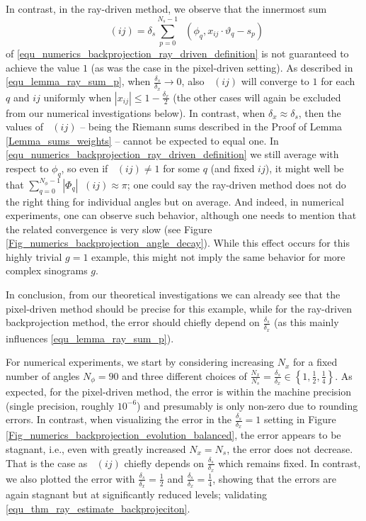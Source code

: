 \documentclass[11pt,reqno]{amsart}
\newcommand{\sums}{\sum_{p=0}^{N_s-1}}
\newcommand{\sumphi}{\sum_{q=0}^{N_\phi-1}}
\DeclareMathOperator{\RayWeight}{\omega^\mathrm{rd}_{\delta_\mathit{x}}}
\DeclareMathOperator{\RayFq}{F^\mathrm{rd}_q}
\numberwithin{theorem}{section}
\theoremstyle{remark}
\begin{document}
In contrast, in the ray-driven method, we observe that the innermost sum 
\[\RayFq (ij) = \delta_s \sums \RayWeight(\phi_q,x_{ij}\cdot \vartheta_q-s_p)\] of \eqref{equ_numerics_backprojection_ray_driven_definition} is not guaranteed to achieve the value $1$ (as was the case in the pixel-driven setting). As described in \eqref{equ_lemma_ray_sum_p}, when $\frac{\delta_s}{\delta_x} \to 0$, also $\RayFq(ij)$ will converge to $1$ for each $q$ and $ij$ uniformly when $|x_{ij}|\leq 1-\frac{\delta_x}{2}$ (the other cases will again be excluded from our numerical investigations below). In contrast, when $\delta_x\approx \delta_s$, then the values of $\RayFq(ij)$ -- being the Riemann sums described in the Proof of Lemma \ref{Lemma_sums_weights} -- cannot be expected to equal one.  In \eqref{equ_numerics_backprojection_ray_driven_definition} we still average with respect to $\phi_q$, so even if $\RayFq(ij)\neq 1$ for some $q$ (and fixed $ij$), it might well be that $\sumphi |\Phi_q| \RayFq(ij) \approx \pi$; one could say the ray-driven method does not do the right thing for individual angles but on average.  
And indeed, in numerical experiments, one can observe such behavior, although one needs to mention that the related convergence is very slow (see Figure \ref{Fig_numerics_backprojection_angle_decay}). While this effect occurs for this highly trivial $g=1$ example, this might not imply the same behavior for more complex sinograms $g$.

In conclusion, from our theoretical investigations we can already see that the pixel-driven method should be precise for this example, while for the ray-driven backprojection method, the error should chiefly depend on $\frac{\delta_s}{\delta_x}$ (as this mainly influences \eqref{equ_lemma_ray_sum_p}).


For numerical experiments, we start by considering increasing $N_x$ for a fixed number of angles $N_\phi=90$ and three different choices of $\frac{N_x}{N_s}=\frac{\delta_s}{\delta_x}\in \left \{1,\frac{1}{2},\frac{1}{4}\right\}$. As expected, for the pixel-driven method, the error is within the machine precision (single precision, roughly $10^{-6}$) and presumably is only non-zero due to rounding errors.
In contrast, when visualizing the error in the $\frac{\delta_s}{\delta_x}=1$ setting in Figure \ref{Fig_numerics_backprojection_evolution_balanced}, the error appears to be stagnant, i.e., even with greatly increased $N_x=N_s$, the error does not decrease. That is the case as $\RayFq(ij)$ chiefly depends on $\frac{\delta_s}{\delta_x}$ which remains fixed. In contrast, we also plotted the error with $\frac{\delta_s}{\delta_x}=\frac{1}{2}$ and $\frac{\delta_s}{\delta_x}=\frac{1}{4}$, showing that the errors are again stagnant but at significantly reduced levels; validating \eqref{equ_thm_ray_estimate_backprojeciton}.
\end{document}
